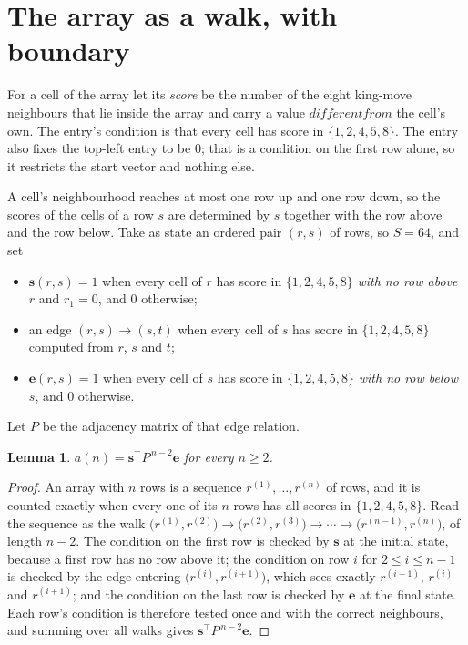 \documentclass[11pt,a4paper]{article}
\theoremstyle{plain}
\newtheorem{lemma}[theorem]{Lemma}
\theoremstyle{definition}
\begin{document}
\section{The array as a walk, with boundary}

For a cell of the array let its \emph{score} be the number of the eight king-move neighbours that lie inside
the array and carry a value $different from$ the cell's own. The entry's condition is that every cell
has score in $\{1,2,4,5,8\}$. The entry also fixes the top-left entry to be $0$; that is a condition on the first row alone, so it restricts the start vector and nothing else.

A cell's neighbourhood reaches at most one row up and one row down, so the scores of the
cells of a row $s$ are determined by $s$ together with the row above and the row below.
Take as state an ordered pair $(r,s)$ of rows, so $S=64$, and set
\begin{itemize}
\item $\mathbf{s}(r,s)=1$ when every cell of $r$ has score in $\{1,2,4,5,8\}$ \emph{with no row
above $r$} and $r_1=0$, and $0$ otherwise;
\item an edge $(r,s)\to(s,t)$ when every cell of $s$ has score in $\{1,2,4,5,8\}$ computed from
$r$, $s$ and $t$;
\item $\mathbf{e}(r,s)=1$ when every cell of $s$ has score in $\{1,2,4,5,8\}$ \emph{with no row
below $s$}, and $0$ otherwise.
\end{itemize}
Let $P$ be the adjacency matrix of that edge relation.

\begin{lemma}\label{lem:walk}
$a(n)=\mathbf{s}^{\!\top}P^{\,n-2}\mathbf{e}$ for every $n\ge2$.
\end{lemma}

\begin{proof}
An array with $n$ rows is a sequence $r^{(1)},\dots,r^{(n)}$ of rows, and it is counted
exactly when every one of its $n$ rows has all scores in $\{1,2,4,5,8\}$. Read the sequence as the
walk $\bigl(r^{(1)},r^{(2)}\bigr)\to\bigl(r^{(2)},r^{(3)}\bigr)\to\cdots\to
\bigl(r^{(n-1)},r^{(n)}\bigr)$, of length $n-2$. The condition on the first row is
checked by $\mathbf{s}$ at the initial state, because a first row has no row above it; the
condition on row $i$ for $2\le i\le n-1$ is checked by the edge entering
$\bigl(r^{(i)},r^{(i+1)}\bigr)$, which sees exactly $r^{(i-1)}$, $r^{(i)}$ and
$r^{(i+1)}$; and the condition on the last row is checked by $\mathbf{e}$ at the final
state. Each row's condition is therefore tested once and with the correct neighbours, and
summing over all walks gives $\mathbf{s}^{\!\top}P^{\,n-2}\mathbf{e}$.
\end{proof}
\end{document}
